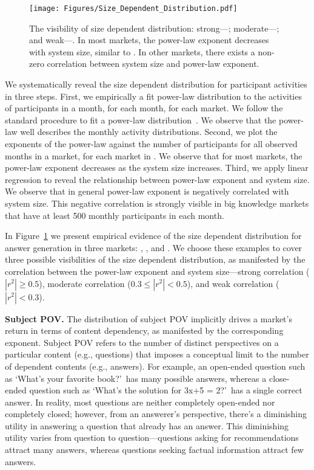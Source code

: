 \begin{figure}[b]
\centering
\texttt{[image: Figures/Size\_Dependent\_Distribution.pdf]}
\caption{The visibility of size dependent distribution: strong---; moderate---; and weak---. In most  markets, the power-law exponent decreases with system size, similar to . In other markets, there exists a non-zero correlation between system size and power-law exponent.}
\label{fig:sdd}
\end{figure}

We systematically reveal the size dependent distribution for participant activities in three steps. First, we empirically a fit power-law distribution to the activities of participants in a month, for each month, for each  market. We follow the standard procedure to fit a power-law distribution~\cite{adamic2000zipf}. We observe that the power-law well describes the monthly activity distributions. Second, we plot the exponents of the power-law against the number of participants for all observed months in a market, for each market in . We observe that for most  markets, the power-law exponent decreases as the system size increases. Third, we apply linear regression to reveal the relationship between power-law exponent and system size. We observe that in general power-law exponent is negatively correlated with system size. This negative correlation is strongly visible in big knowledge markets that have at least 500 monthly participants in each month.

In Figure~\ref{fig:sdd} we present empirical evidence of the size dependent distribution for answer generation in three  markets: , , and . We choose these examples to cover three possible visibilities of the size dependent distribution, as manifested by the correlation between 
the power-law exponent and system size---strong correlation ($|r^2|\geq 0.5$), moderate correlation ($0.3\leq |r^2|<0.5$), and weak correlation ($|r^2|<0.3$).

\textbf{Subject POV.} The distribution of subject POV implicitly drives a market's return in terms of content dependency, as manifested by the corresponding exponent. Subject POV refers to the number of distinct perspectives on a particular content (e.g., questions) that imposes a conceptual limit to the number of dependent contents (e.g., answers). For example, an open-ended question such as \lq What's your favorite book?\rq\ has many possible answers, whereas a close-ended question such as \lq What's the solution for 3x+5 = 2?\rq\ has a single correct answer. In reality, most questions are neither completely open-ended nor completely closed; however, from an answerer's perspective, there's a diminishing utility in answering a question that already has an answer. This diminishing utility varies from question to question---questions asking for recommendations attract many answers, whereas questions seeking factual information attract few answers. 

